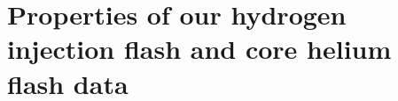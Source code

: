 \documentclass[10pt,paper=a4]{report}
\newcommand{\eht}{\overline}
\newcommand{\fht}{\widetilde}
\begin{document}









\newpage


\section{Properties of our hydrogen injection flash and core helium flash data}
\end{document}
